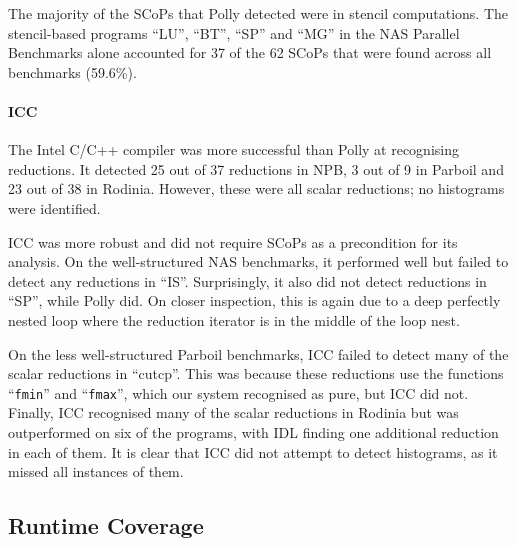    The majority of the SCoPs that Polly detected were in stencil computations.
    The stencil-based programs ``LU'', ``BT'', ``SP'' and ``MG'' in the NAS
    Parallel Benchmarks alone accounted for 37 of the 62 SCoPs that were found
    across all benchmarks (59.6\%).

    \paragraph*{ICC}
    The Intel C/C++ compiler was more successful than Polly at recognising
    reductions.
    It detected 25 out of 37 reductions in NPB, 3 out of 9 in Parboil and
    23 out of 38 in Rodinia.
    However, these were all scalar reductions; no histograms were identified.

    ICC was more robust and did not require SCoPs as a precondition for its
    analysis.
    On the well-structured NAS benchmarks, it performed well but failed to
    detect any reductions in ``IS''.
    Surprisingly, it also did not detect reductions in ``SP'', while Polly did.
    On closer inspection, this is again due to a deep perfectly nested loop
    where the reduction iterator is in the middle of the loop nest.

    On the less well-structured Parboil benchmarks, ICC failed to detect many of
    the scalar reductions in ``cutcp''.
    This was because these reductions use the functions ``{\tt fmin}'' and
    ``{\tt fmax}'', which our system recognised as pure, but ICC did not.
    Finally, ICC recognised many of the scalar reductions in Rodinia but was
    outperformed on six of the programs, with IDL finding one additional
    reduction in each of them.
    It is clear that ICC did not attempt to detect histograms, as it missed all
    instances of them.

\subsection{Runtime Coverage}

